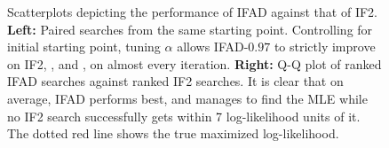 \documentclass[11pt]{article}
\begin{document}
\begin{figure}[htbp!]
    \caption{Scatterplots depicting the performance of IFAD against that of IF2. \textbf{Left:} Paired searches from the same starting point. Controlling for initial starting point, tuning $\alpha$ allows IFAD-$0.97$ to strictly improve on IF2, \cite{poyiadjis11}, and \cite{naesseth18}, on almost every iteration. \textbf{Right:} Q-Q plot of ranked IFAD searches against ranked IF2 searches. It is clear that on average, IFAD performs best, and manages to find the MLE while no IF2 search successfully gets within 7 log-likelihood units of it. The dotted red line shows the true maximized log-likelihood. }
    \label{fig:scatter}
\end{figure}


  
\end{document}
